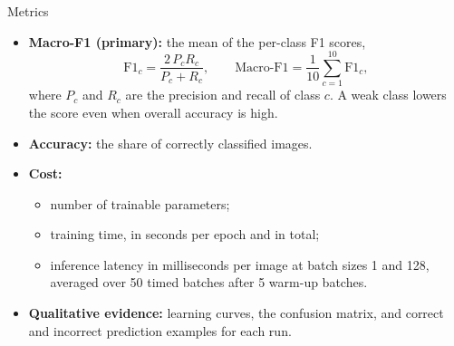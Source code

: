 \begin{frame}{Metrics}
\small
\begin{itemize}
    \item \textbf{Macro-F1 (primary):} the mean of the per-class F1 scores,
          \[
              \mathrm{F1}_c = \frac{2\,P_c R_c}{P_c + R_c}, \qquad
              \text{Macro-F1} = \frac{1}{10} \sum_{c=1}^{10} \mathrm{F1}_c ,
          \]
          where $P_c$ and $R_c$ are the precision and recall of class $c$. A weak class lowers the score
          even when overall accuracy is high.
    \item \textbf{Accuracy:} the share of correctly classified images.
    \item \textbf{Cost:}
    \begin{itemize}
        \item number of trainable parameters;
        \item training time, in seconds per epoch and in total;
        \item inference latency in milliseconds per image at batch sizes 1 and 128,
              averaged over 50 timed batches after 5 warm-up batches.
    \end{itemize}
    \item \textbf{Qualitative evidence:} learning curves, the confusion matrix, and correct and incorrect
          prediction examples for each run.
\end{itemize}
\end{frame}

